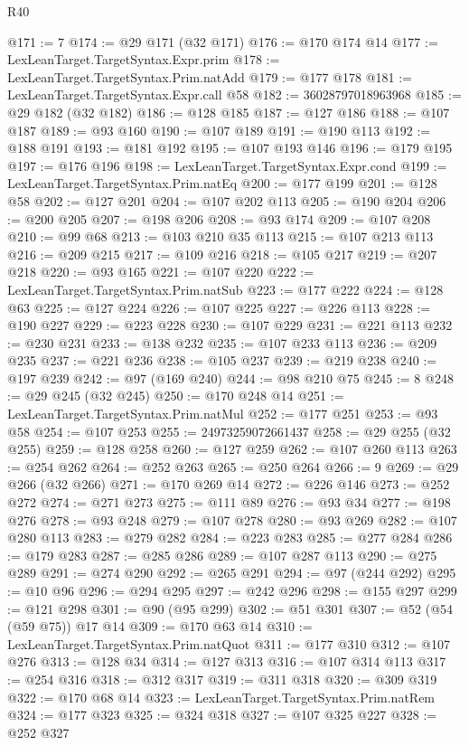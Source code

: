 \begin{lexlean}{R40}
\begin{coremodule}
@171 := 7
@174 := @29 @171 (@32 @171)
@176 := @170 @174 @14
@177 := LexLeanTarget.TargetSyntax.Expr.prim
@178 := LexLeanTarget.TargetSyntax.Prim.natAdd
@179 := @177 @178
@181 := LexLeanTarget.TargetSyntax.Expr.call @58
@182 := 36028797018963968
@185 := @29 @182 (@32 @182)
@186 := @128 @185
@187 := @127 @186
@188 := @107 @187
@189 := @93 @160
@190 := @107 @189
@191 := @190 @113
@192 := @188 @191
@193 := @181 @192
@195 := @107 @193 @146
@196 := @179 @195
@197 := @176 @196
@198 := LexLeanTarget.TargetSyntax.Expr.cond
@199 := LexLeanTarget.TargetSyntax.Prim.natEq
@200 := @177 @199
@201 := @128 @58
@202 := @127 @201
@204 := @107 @202 @113
@205 := @190 @204
@206 := @200 @205
@207 := @198 @206
@208 := @93 @174
@209 := @107 @208
@210 := @99 @68
@213 := @103 @210 @35 @113
@215 := @107 @213 @113
@216 := @209 @215
@217 := @109 @216
@218 := @105 @217
@219 := @207 @218
@220 := @93 @165
@221 := @107 @220
@222 := LexLeanTarget.TargetSyntax.Prim.natSub
@223 := @177 @222
@224 := @128 @63
@225 := @127 @224
@226 := @107 @225
@227 := @226 @113
@228 := @190 @227
@229 := @223 @228
@230 := @107 @229
@231 := @221 @113
@232 := @230 @231
@233 := @138 @232
@235 := @107 @233 @113
@236 := @209 @235
@237 := @221 @236
@238 := @105 @237
@239 := @219 @238
@240 := @197 @239
@242 := @97 (@169 @240)
@244 := @98 @210 @75
@245 := 8
@248 := @29 @245 (@32 @245)
@250 := @170 @248 @14
@251 := LexLeanTarget.TargetSyntax.Prim.natMul
@252 := @177 @251
@253 := @93 @58
@254 := @107 @253
@255 := 24973259072661437
@258 := @29 @255 (@32 @255)
@259 := @128 @258
@260 := @127 @259
@262 := @107 @260 @113
@263 := @254 @262
@264 := @252 @263
@265 := @250 @264
@266 := 9
@269 := @29 @266 (@32 @266)
@271 := @170 @269 @14
@272 := @226 @146
@273 := @252 @272
@274 := @271 @273
@275 := @111 @89
@276 := @93 @34
@277 := @198 @276
@278 := @93 @248
@279 := @107 @278
@280 := @93 @269
@282 := @107 @280 @113
@283 := @279 @282
@284 := @223 @283
@285 := @277 @284
@286 := @179 @283
@287 := @285 @286
@289 := @107 @287 @113
@290 := @275 @289
@291 := @274 @290
@292 := @265 @291
@294 := @97 (@244 @292)
@295 := @10 @96
@296 := @294 @295
@297 := @242 @296
@298 := @155 @297
@299 := @121 @298
@301 := @90 (@95 @299)
@302 := @51 @301
@307 := @52 (@54 (@59 @75)) @17 @14
@309 := @170 @63 @14
@310 := LexLeanTarget.TargetSyntax.Prim.natQuot
@311 := @177 @310
@312 := @107 @276
@313 := @128 @34
@314 := @127 @313
@316 := @107 @314 @113
@317 := @254 @316
@318 := @312 @317
@319 := @311 @318
@320 := @309 @319
@322 := @170 @68 @14
@323 := LexLeanTarget.TargetSyntax.Prim.natRem
@324 := @177 @323
@325 := @324 @318
@327 := @107 @325 @227
@328 := @252 @327

\end{coremodule}
\end{lexlean}
